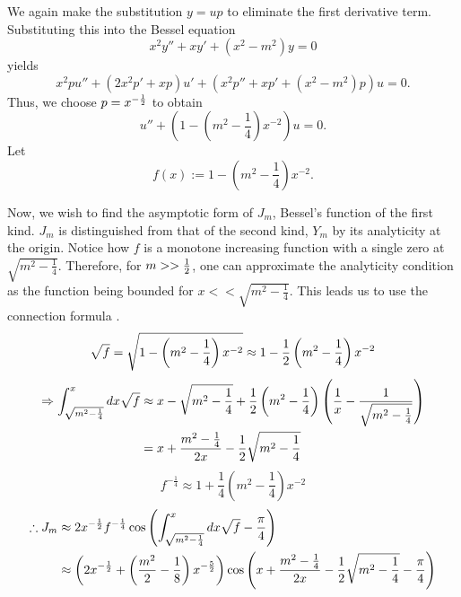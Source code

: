 \item
We again make the substitution $y = up$ to eliminate the first derivative term.
Substituting this into the Bessel equation
\[
	x^2 y'' + xy' + \left( x^2 - m^2 \right) y = 0
\]
yields
\[
	x^2 pu'' + \left( 2x^2 p' + xp \right)u' + \left( x^2 p'' + xp' + \left( x^2 - m^2 \right)p \right)u = 0.
\]
Thus, we choose $p = x^{-\frac{1}{2}}$ to obtain
\[
	u'' + \left( 1 - \left( m^2 - \frac{1}{4} \right) x^{-2} \right) u = 0.
\]
Let
\[
	f(x) := 1 - \left( m^2 - \frac{1}{4} \right) x^{-2}.
\]

Now, we wish to find the asymptotic form of $J_m$, Bessel's function of the first kind.
$J_m$ is distinguished from that of the second kind, $Y_m$ by its analyticity at the origin.
Notice how $f$ is a monotone increasing function with a single zero at $\sqrt{m^2 - \frac{1}{4}}$.
Therefore, for $m >> \frac{1}{2}$, one can approximate the analyticity condition as the function being bounded for $x << \sqrt{m^2 - \frac{1}{4}}$.
This leads us to use the connection formula .
\[
	\sqrt{f}
	= \sqrt{1 - \left( m^2 - \frac{1}{4} \right) x^{-2}}
	\approx 1 - \frac{1}{2} \left( m^2 - \frac{1}{4} \right) x^{-2}
\]
\begin{align*}
	\Rightarrow \int_{\sqrt{m^2 - \frac{1}{4}}}^{x} dx \sqrt{f}
	 & \approx x - \sqrt{m^2 - \frac{1}{4}} + \frac{1}{2} \left( m^2 - \frac{1}{4} \right) \left( \frac{1}{x} - \frac{1}{\sqrt{m^2 - \frac{1}{4}}} \right) \\
	 & = x + \frac{m^2 - \frac{1}{4}}{2x} - \frac{1}{2}\sqrt{m^2 - \frac{1}{4}}
\end{align*}
\[
	f^{-\frac{1}{4}} \approx 1 + \frac{1}{4} \left( m^2 - \frac{1}{4} \right) x^{-2}
\]
\begin{align*}
	\therefore J_m
	 & \approx 2 x^{-\frac{1}{2}} f^{-\frac{1}{4}} \cos\left( \int_{\sqrt{m^2 - \frac{1}{4}}}^{x} dx \sqrt{f} - \frac{\pi}{4} \right) \\
	 & \approx \left( 2x^{-\frac{1}{2}} + \left( \frac{m^2}{2} - \frac{1}{8} \right) x^{-\frac{5}{2}} \right)
	\cos\left( x + \frac{m^2 - \frac{1}{4}}{2x} - \frac{1}{2}\sqrt{m^2 - \frac{1}{4}} - \frac{\pi}{4} \right)
\end{align*}

